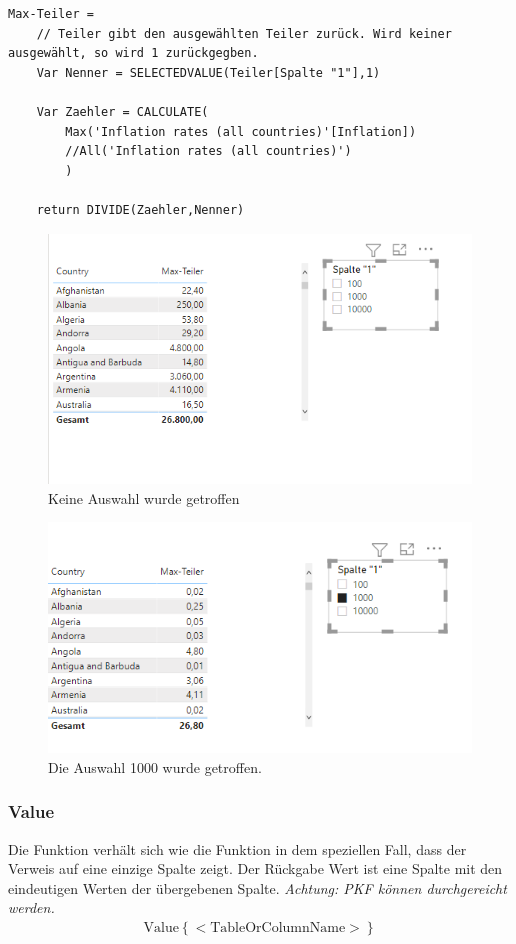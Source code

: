 \begin{lstlisting}[style=DAX]
Max-Teiler = 
	// Teiler gibt den ausgewählten Teiler zurück. Wird keiner ausgewählt, so wird 1 zurückgegben.
	Var Nenner = SELECTEDVALUE(Teiler[Spalte "1"],1)
	
	Var Zaehler = CALCULATE(
		Max('Inflation rates (all countries)'[Inflation])
		//All('Inflation rates (all countries)')
		)
	
	return DIVIDE(Zaehler,Nenner)
\end{lstlisting}
\begin{figure}[H]
	\centering
	\includegraphics[scale = 0.3]{attachment/chapter_1/Scc158}
	\caption{Keine Auswahl wurde getroffen}
\end{figure}

\begin{figure}[H]
	\centering
	\includegraphics[scale = 0.3]{attachment/chapter_1/Scc159}
	\caption{Die Auswahl 1000 wurde getroffen.}
\end{figure}


\subsubsection{Value}
Die Funktion  verhält sich wie die  Funktion in dem speziellen Fall, dass der Verweis auf eine einzige Spalte zeigt. Der Rückgabe Wert ist eine Spalte mit den eindeutigen Werten der übergebenen Spalte. 
\textit{Achtung: \gls{PKF} können durchgereicht werden.}
\begin{align*}
	\text{Value} \left\lbrace <\text{TableOrColumnName}>\right\rbrace
\end{align*}

